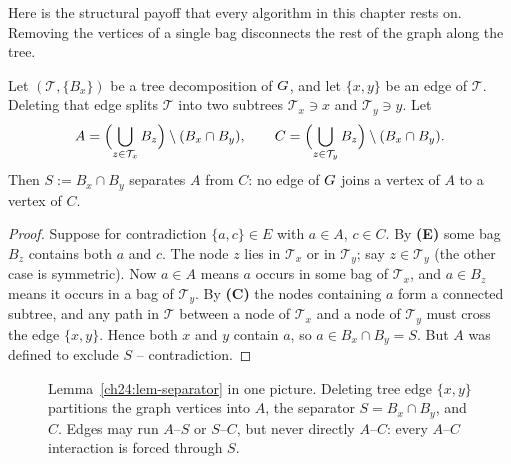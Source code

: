 Here is the structural payoff that every algorithm in this chapter rests on.
Removing the vertices of a single bag disconnects the rest of the graph along the
tree.

\begin{lemma}
\label{ch24:lem-separator}
Let $(\mathcal{T},\{B_x\})$ be a tree decomposition of $G$, and let
$\{x,y\}$ be an edge of $\mathcal{T}$. Deleting that edge splits $\mathcal{T}$
into two subtrees $\mathcal{T}_x\ni x$ and $\mathcal{T}_y\ni y$. Let
\[
  A = \Bigl(\bigcup_{z\in\mathcal{T}_x} B_z\Bigr)\setminus (B_x\cap B_y),
  \qquad
  C = \Bigl(\bigcup_{z\in\mathcal{T}_y} B_z\Bigr)\setminus (B_x\cap B_y).
\]
Then $S := B_x\cap B_y$ separates $A$ from $C$: no edge of $G$ joins a vertex
of $A$ to a vertex of $C$.
\end{lemma}

\begin{proof}
Suppose for contradiction $\{a,c\}\in E$ with $a\in A$, $c\in C$. By \textbf{(E)}
some bag $B_z$ contains both $a$ and $c$. The node $z$ lies in $\mathcal{T}_x$ or
in $\mathcal{T}_y$; say $z\in\mathcal{T}_y$ (the other case is symmetric). Now
$a\in A$ means $a$ occurs in some bag of $\mathcal{T}_x$, and $a\in B_z$ means it
occurs in a bag of $\mathcal{T}_y$. By \textbf{(C)} the nodes containing $a$ form
a connected subtree, and any path in $\mathcal{T}$ between a node of
$\mathcal{T}_x$ and a node of $\mathcal{T}_y$ must cross the edge $\{x,y\}$. Hence
both $x$ and $y$ contain $a$, so $a\in B_x\cap B_y=S$. But $A$ was defined to
exclude $S$ -- contradiction.
\end{proof}

\begin{figure}[H]
\centering
{}
\caption{Lemma~\ref{ch24:lem-separator} in one picture. Deleting tree edge
$\{x,y\}$ partitions the graph vertices into $A$, the separator $S=B_x\cap B_y$,
and $C$. Edges may run $A$--$S$ or $S$--$C$, but never directly $A$--$C$: every
$A$--$C$ interaction is forced through $S$.}
\label{ch24:fig-separator}
\end{figure}

